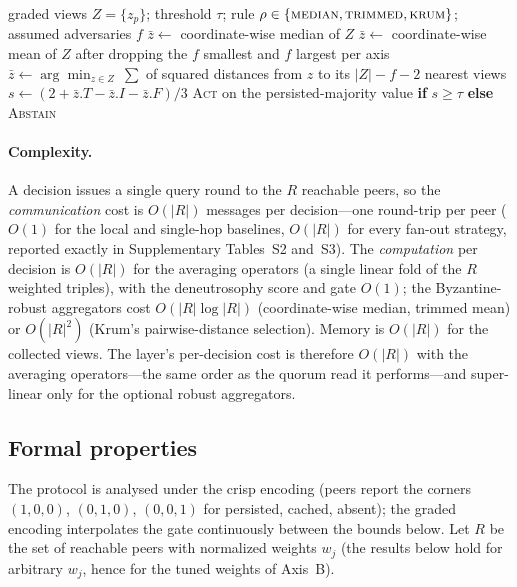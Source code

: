 \documentclass[fleqn,10pt]{wlscirep}
\begin{document}
\begin{algorithm}[t]
\caption{Byzantine-robust freshness gate}
\label{alg:robust}
\begin{algorithmic}[1]
\Require graded views $Z=\{z_p\}$; threshold $\tau$; rule $\rho\in\{\textsc{median},\textsc{trimmed},\textsc{krum}\}$; assumed adversaries $f$
 \State $\bar z\gets$ coordinate-wise median of $Z$
 \State $\bar z\gets$ coordinate-wise mean of $Z$ after dropping the $f$ smallest and $f$ largest per axis
 \State $\bar z\gets \arg\min_{z\in Z}\ \textstyle\sum$ of squared distances from $z$ to its $|Z|-f-2$ nearest views
\EndIf
\State $s\gets(2+\bar z.T-\bar z.I-\bar z.F)/3$
\State \Return \textsc{Act} on the persisted-majority value \textbf{if} $s\ge\tau$ \textbf{else} \textsc{Abstain}
\end{algorithmic}
\end{algorithm}

\paragraph{Complexity.} A decision issues a single query round to the $R$ reachable peers, so the
\emph{communication} cost is $O(|R|)$ messages per decision---one round-trip per peer ($O(1)$ for the
local and single-hop baselines, $O(|R|)$ for every fan-out strategy, reported exactly in
Supplementary Tables~S2 and~S3). The \emph{computation} per decision is $O(|R|)$ for
the averaging operators (a single linear fold of the $R$ weighted triples), with the deneutrosophy score
and gate $O(1)$; the Byzantine-robust aggregators cost $O(|R|\log|R|)$ (coordinate-wise median, trimmed
mean) or $O(|R|^2)$ (Krum's pairwise-distance selection). Memory is $O(|R|)$ for the collected views. The
layer's per-decision cost is therefore $O(|R|)$ with the averaging operators---the same order as the
quorum read it performs---and super-linear only for the optional robust aggregators.

\subsection{Formal properties}
\label{sec:formal}
The protocol is analysed under the crisp encoding (peers report the corners $(1,0,0)$, $(0,1,0)$,
$(0,0,1)$ for persisted, cached, absent); the graded encoding interpolates the gate continuously
between the bounds below. Let $R$ be the set of reachable peers with normalized weights $w_j$ (the
results below hold for arbitrary $w_j$, hence for the tuned weights of Axis~B).
\end{document}
